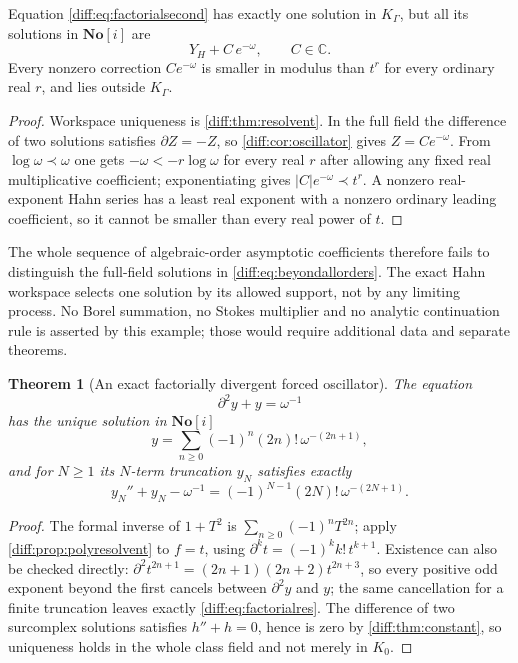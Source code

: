 \documentclass[11pt,letterpaper]{article}
\numberwithin{equation}{section}
\newtheorem{theorem}{Theorem}[section]
\theoremstyle{definition}
\theoremstyle{remark}
\newcommand{\SC}{\mathbf{No}[i]}
\newcommand{\C}{\mathbb C}
\newcommand{\der}{\partial}
\newcommand{\abs}[1]{\lvert#1\rvert}
\begin{document}
\begin{proposition}
\label{diff:prop:factorialambiguity}
Equation \cref{diff:eq:factorialsecond} has exactly one solution in
$K_{\Gamma}$, but all its solutions in $\SC$ are
\begin{equation}\label{diff:eq:beyondallorders}
 Y_{H}+C\,e^{-\omega},\qquad C\in\C .
\end{equation}
Every nonzero correction $Ce^{-\omega}$ is smaller in modulus than $t^{r}$ for
every ordinary real $r$, and lies outside $K_{\Gamma}$.
\end{proposition}
\begin{proof}
Workspace uniqueness is \cref{diff:thm:resolvent}. In the full field the
difference of two solutions satisfies $\der Z=-Z$, so
\cref{diff:cor:oscillator} gives $Z=Ce^{-\omega}$. From
$\log\omega\prec\omega$ one gets $-\omega<-r\log\omega$ for every real $r$
after allowing any fixed real multiplicative coefficient; exponentiating gives
$\abs Ce^{-\omega}\prec t^{r}$. A nonzero real-exponent Hahn series has a
least real exponent with a nonzero ordinary leading coefficient, so it cannot
be smaller than every real power of $t$.
\end{proof}

The whole sequence of algebraic-order asymptotic coefficients therefore fails
to distinguish the full-field solutions in
\cref{diff:eq:beyondallorders}. The exact Hahn workspace selects one solution
by its allowed support, not by any limiting process. No Borel summation, no
Stokes multiplier and no analytic continuation rule is asserted by this
example; those would require additional data and separate theorems.

\begin{theorem}[An exact factorially divergent forced oscillator]
\label{diff:thm:factorial}
The equation
\begin{equation}\label{diff:eq:forcedosc}
 \der^{2}y+y=\omega^{-1}
\end{equation}
has the unique solution in $\SC$
\begin{equation}\label{diff:eq:factorial}
 y=\sum_{n\geq0}(-1)^{n}(2n)!\,\omega^{-(2n+1)},
\end{equation}
and for $N\geq1$ its $N$-term truncation $y_{N}$ satisfies exactly
\begin{equation}\label{diff:eq:factorialres}
 y_{N}''+y_{N}-\omega^{-1}=(-1)^{N-1}(2N)!\,\omega^{-(2N+1)} .
\end{equation}
\end{theorem}
\begin{proof}
The formal inverse of $1+T^{2}$ is $\sum_{n\geq0}(-1)^{n}T^{2n}$; apply
\cref{diff:prop:polyresolvent} to $f=t$, using
$\der^{k}t=(-1)^{k}k!\,t^{k+1}$. Existence can also be checked directly:
$\der^{2}t^{2n+1}=(2n+1)(2n+2)t^{2n+3}$, so every positive odd exponent beyond
the first cancels between $\der^{2}y$ and $y$; the same cancellation for a
finite truncation leaves exactly \cref{diff:eq:factorialres}. The difference of
two surcomplex solutions satisfies $h''+h=0$, hence is zero by
\cref{diff:thm:constant}, so uniqueness holds in the whole class field and not
merely in $K_{0}$.
\end{proof}
\end{document}
